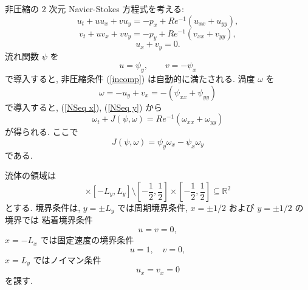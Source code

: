 \documentclass[12pt,a4j]{jsarticle}
\newcommand{\R}{\mathbb{R}}
\begin{document}
非圧縮の $2$ 次元 Navier-Stokes 方程式を考える:
\begin{equation}
 u_{t} + u u_{x} + v u_{y} 
  = - p_{x} + Re^{-1} (u_{xx} + u_{yy}),
  \label{NSeq x}
\end{equation}
\begin{equation}
 v_{t} + u v_{x} + v v_{y}
  = - p_{y} + Re^{-1} (v_{xx} + v_{yy}),
  \label{NSeq y}
\end{equation}
\begin{equation}
 u_{x} + v_{y} = 0.
  \label{incomp}
\end{equation}
流れ関数 $\psi$ を
\begin{equation}
  u =   \psi_{y}, \qquad
  v = - \psi_{x}
  \label{stream func}
\end{equation}
で導入すると, 非圧縮条件 (\ref{incomp}) は自動的に満たされる.
渦度 $\omega$ を
\begin{equation}
 \omega = - u_{y} + v_{x} = - (\psi_{xx} + \psi_{yy})
  \label{vorticity}
\end{equation}
で導入すると, (\ref{NSeq x}), (\ref{NSeq y}) から
\begin{equation}
 \omega_{t} + J(\psi, \omega) 
  = Re^{-1} (\omega_{xx} + \omega_{yy})
  \label{vorticity eq}
\end{equation}
が得られる. ここで
\begin{equation}
 J(\psi, \omega) = \psi_{y} \omega_{x} - \psi_{x} \omega_{y}
  \label{def Jacobi}
\end{equation}
である. \par

流体の領域は
\begin{equation}
 [- L_{x}, L_{x}] \times [- L_{y}, L_{y}]
  \setminus
  \left[ -\dfrac{1}{2}, \dfrac{1}{2} \right]
  \times
  \left[ -\dfrac{1}{2}, \dfrac{1}{2} \right]
  \subseteq
  \R^{2}
\end{equation}
とする. 境界条件は,
$y = \pm L_{y}$ では周期境界条件,
$x = \pm 1/2$ および $y = \pm 1/2$ の境界では
粘着境界条件
\begin{equation}
 u = v = 0,
\end{equation}
$x = - L_{x}$ では固定速度の境界条件
\begin{equation}
 u = 1, \quad
 v = 0,
\end{equation}
$x = L_{y}$ ではノイマン条件
\begin{equation}
 u_{x} = v_{x} = 0
\end{equation}
を課す.
\end{document}
